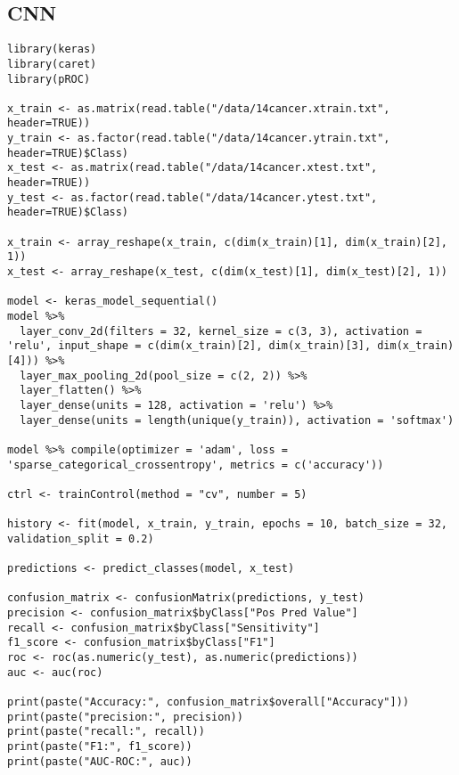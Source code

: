 \documentclass{article}
\begin{document}
\subsection{CNN}
\begin{lstlisting}
library(keras)
library(caret)
library(pROC)

x_train <- as.matrix(read.table("/data/14cancer.xtrain.txt", header=TRUE))
y_train <- as.factor(read.table("/data/14cancer.ytrain.txt", header=TRUE)$Class)
x_test <- as.matrix(read.table("/data/14cancer.xtest.txt", header=TRUE))
y_test <- as.factor(read.table("/data/14cancer.ytest.txt", header=TRUE)$Class)

x_train <- array_reshape(x_train, c(dim(x_train)[1], dim(x_train)[2], 1))
x_test <- array_reshape(x_test, c(dim(x_test)[1], dim(x_test)[2], 1))

model <- keras_model_sequential()
model %>%
  layer_conv_2d(filters = 32, kernel_size = c(3, 3), activation = 'relu', input_shape = c(dim(x_train)[2], dim(x_train)[3], dim(x_train)[4])) %>%
  layer_max_pooling_2d(pool_size = c(2, 2)) %>%
  layer_flatten() %>%
  layer_dense(units = 128, activation = 'relu') %>%
  layer_dense(units = length(unique(y_train)), activation = 'softmax')

model %>% compile(optimizer = 'adam', loss = 'sparse_categorical_crossentropy', metrics = c('accuracy'))

ctrl <- trainControl(method = "cv", number = 5)

history <- fit(model, x_train, y_train, epochs = 10, batch_size = 32, validation_split = 0.2)

predictions <- predict_classes(model, x_test)

confusion_matrix <- confusionMatrix(predictions, y_test)
precision <- confusion_matrix$byClass["Pos Pred Value"]
recall <- confusion_matrix$byClass["Sensitivity"]
f1_score <- confusion_matrix$byClass["F1"]
roc <- roc(as.numeric(y_test), as.numeric(predictions))
auc <- auc(roc)

print(paste("Accuracy:", confusion_matrix$overall["Accuracy"]))
print(paste("precision:", precision))
print(paste("recall:", recall))
print(paste("F1:", f1_score))
print(paste("AUC-ROC:", auc))
\end{lstlisting}
\end{document}
